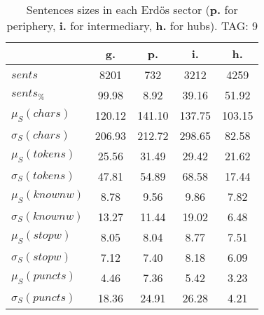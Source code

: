 \begin{table}[h!]
\begin{center}
\begin{tabular}{| l || c | c | c | c |}\hline
 & {\bf g.} & {\bf p.} & {\bf i.} & {\bf h.} \\\hline\hline
$sents$ & 8201  & 732  & 3212  & 4259 \\
$sents_{\%}$ & 99.98  & 8.92  & 39.16  & 51.92 \\\hline
$\mu_S(chars)$ & 120.12  & 141.10  & 137.75  & 103.15 \\
$\sigma_S(chars)$ & 206.93  & 212.72  & 298.65  & 82.58 \\\hline
$\mu_S(tokens)$ & 25.56  & 31.49  & 29.42  & 21.62 \\
$\sigma_S(tokens)$ & 47.81  & 54.89  & 68.58  & 17.44 \\\hline
$\mu_S(knownw)$ & 8.78  & 9.56  & 9.86  & 7.82 \\
$\sigma_S(knownw)$ & 13.27  & 11.44  & 19.02  & 6.48 \\\hline
$\mu_S(stopw)$ & 8.05  & 8.04  & 8.77  & 7.51 \\
$\sigma_S(stopw)$ & 7.12  & 7.40  & 8.18  & 6.09 \\\hline
$\mu_S(puncts)$ & 4.46  & 7.36  & 5.42  & 3.23 \\
$\sigma_S(puncts)$ & 18.36  & 24.91  & 26.28  & 4.21 \\\hline
\end{tabular}
\caption{Sentences sizes in each Erd\"os sector ({{\bf p.}} for periphery, {{\bf i.}} for intermediary, {{\bf h.}} for hubs). TAG: 9}
\end{center}
\end{table}